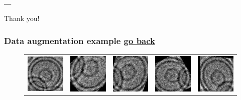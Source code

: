 \documentclass{beamer}
\begin{document}
\begin{frame}
\frametitle{\_}
\begin{center}
\Huge Thank you!
\end{center}
\end{frame}


\appendix
%
%

\begin{frame}[label=data_augmentation]
\frametitle{Data augmentation example \hyperlink{pitfalls<2>}{\underline{go back}}}
\begin{figure}
\centering
\begin{tabular}{ccccc}
\includegraphics[scale=0.5]{augmented/541253.jpg} & \includegraphics[scale=0.5]{augmented/_0_645.jpeg} & \includegraphics[scale=0.5]{augmented/_0_1385.jpeg} & \includegraphics[scale=0.5]{augmented/_0_1749.jpeg} & \includegraphics[scale=0.5]{augmented/_0_2343.jpeg} \\


\end{tabular}
\end{figure}
\end{frame}
\end{document}
